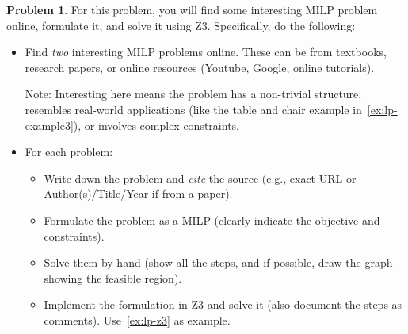 \documentclass[oneside,11pt,dvipsnames]{book}
\numberwithin{equation}{section}
\theoremstyle{definition}
\newtheorem{problem}{Problem}[section]
\theoremstyle{remark}
\begin{document}
\begin{problem}\label{ex:milp-online}
For this problem, you will find some interesting MILP problem online, formulate it, and solve it using Z3. Specifically, do the following:
\begin{itemize}
\item Find \emph{two} interesting MILP problems online. These can be from textbooks, research papers, or online resources (Youtube, Google, online tutorials).

Note: Interesting here means the problem has a non-trivial structure, resembles real-world applications (like the table and chair example in~\autoref{ex:lp-example3}), or involves complex constraints.
\item For each problem:
\begin{itemize}
    \item Write down the problem and \emph{cite} the source (e.g., exact URL or Author(s)/Title/Year if from a paper).
    \item Formulate the problem as a MILP (clearly indicate the objective and constraints).
    \item Solve them by hand (show all the steps, and if possible, draw the graph showing the feasible region).
    \item Implement the formulation in Z3 and solve it (also document the steps as comments). Use~\autoref{ex:lp-z3} as example.
\end{itemize}
\end{itemize}

\end{problem}
\end{document}
